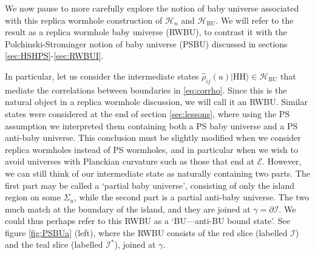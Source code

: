 \documentclass[letterpaper,12pt]{article}
\newcommand*{\hilb}{\mathcal{H}}	%
\newcommand*{\hbu}{\mathcal{H}_\text{BU}} %
\newcommand*{\evap}{\mathscr{E}} %
\newcommand*{\island}{\mathcal{I}}
\newcommand{\HH}{\mathrm{HH}} %
\begin{document}
We now pause to more carefully explore the notion of baby universe associated with this replica wormhole construction of $\hilb_n$ and $\hbu$.  We will refer to the result as a replica wormhole baby universe (RWBU), to contrast it with the Polchinski-Strominger notion of baby universe (PSBU) discussed in sections \ref{sec:HSHPS}-\ref{sec:RWBUI}.

In particular, let us consider the  intermediate states $\hat{\rho}_{ij}(u)|\HH\rangle \in \hbu$ that mediate the correlations between boundaries in \eqref{eq:corrho}. Since this is the natural object in a replica wormhole discussion, we will call it an RWBU.  Similar states were considered at the end of section \ref{sec:lessons}, where using the PS assumption we interpreted them containing both a PS baby universe and a PS anti-baby universe.  This conclusion must be slightly modified  when we consider replica wormholes instead of PS wormholes, and in particular when we wish to avoid universes with Planckian curvature such as those that end at $\evap$.  However, we can still think of our intermediate state as naturally containing two parts.  The first part may be called a  `partial baby universe', consisting of only the island region on some $\Sigma_u$, while the second part is a partial anti-baby universe.  The two much match at the boundary of the island, and they are joined at $\gamma=\partial \island$.  We could thus perhaps refer to this RWBU as a `BU---anti-BU bound state'. See figure \ref{fig:PSBUa} (left), where the RWBU consists of the red slice (labelled $\island$) and the teal slice (labelled $\island^*$), joined at $\gamma$.
\end{document}
